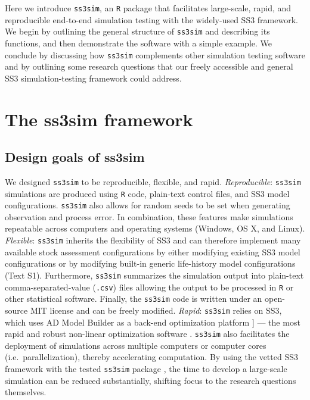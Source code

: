 \documentclass[11pt]{article}
\begin{document}
Here we introduce \texttt{ss3sim}, an \texttt{R} package that facilitates large-scale, rapid, and reproducible end-to-end simulation testing with the widely-used SS3 framework. We begin by outlining the general structure of \texttt{ss3sim} and describing its functions, and then demonstrate the software with a simple example. We conclude by discussing how \texttt{ss3sim} complements other simulation testing software and by outlining some research questions that our freely accessible and general SS3 simulation-testing framework could address.

\section*{The ss3sim framework}

\subsection*{Design goals of ss3sim}

We designed \texttt{ss3sim} to be reproducible, flexible, and rapid. \emph{Reproducible}: \texttt{ss3sim} simulations are produced using \texttt{R} code, plain-text control files, and SS3 model configurations. \texttt{ss3sim} also allows for random seeds to be set when generating observation and process error. In combination, these features make simulations repeatable across computers and operating systems (Windows, OS X, and Linux). \emph{Flexible}: \texttt{ss3sim} inherits the flexibility of SS3 and can therefore implement many available stock assessment configurations by either modifying existing SS3 model configurations or by modifying built-in generic life-history model configurations (Text S1). Furthermore, \texttt{ss3sim} summarizes the simulation output into plain-text comma-separated-value (\texttt{.csv}) files allowing the output to be processed in \texttt{R} or other statistical software. Finally, the \texttt{ss3sim} code is written under an open-source MIT license and can be freely modified. \emph{Rapid}: \texttt{ss3sim} relies on SS3, which uses AD Model Builder as a back-end optimization platform \cite{fournier2012}{]} --- the most rapid and robust non-linear optimization software \cite{bolker2013}. \texttt{ss3sim} also facilitates the deployment of simulations across multiple computers or computer cores (i.e.~parallelization), thereby accelerating computation. By using the vetted SS3 framework \cite{methot2013} with the tested \texttt{ss3sim} package \cite{johnson2013, ono2013}, the time to develop a large-scale simulation can be reduced substantially, shifting focus to the research questions themselves.
\end{document}
